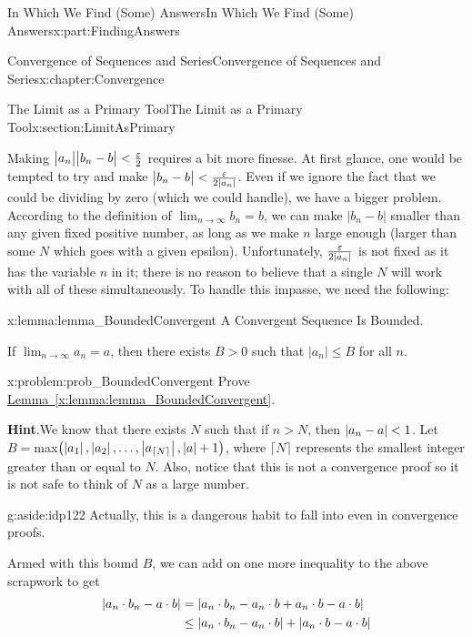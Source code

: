 \begin{partptx}{In Which We Find (Some) Answers}{}{In Which We Find (Some) Answers}{}{}{x:part:FindingAnswers}
\begin{chapterptx}{Convergence of Sequences and Series}{}{Convergence of Sequences and Series}{}{}{x:chapter:Convergence}
\begin{sectionptx}{The Limit as a Primary Tool}{}{The Limit as a Primary Tool}{}{}{x:section:LimitAsPrimary}
			\par
			Making \(\big|a_n\big|\big|b_n-b\big|< \frac{\varepsilon}{2}\) requires a bit more finesse. At first glance, one would be tempted to try and make \(\big|b_n-b\big|< \frac{\varepsilon}{2|a_n|}\). Even if we ignore the fact that we could be dividing by zero (which we could handle), we have a bigger problem. According to the definition of \(\lim_{n\rightarrow\infty}b_n=b\), we can make \(\big|b_n-b\big|\) smaller than any given fixed positive number, as long as we make \(n\) large enough (larger than some \(N\) which goes with a given epsilon). Unfortunately, \(\frac{\varepsilon}{2|a_n|}\) is not fixed as it has the variable \(n\) in it; there is no reason to believe that a single \(N\) will work with all of these simultaneously. To handle this impasse, we need the following:%
			\begin{lemma}{}{}{x:lemma:lemma_BoundedConvergent}%
				\alert{A Convergent Sequence Is Bounded.}%
				\par
				If \(\lim_{n\rightarrow\infty}a_n=a\), then there exists \(B>0\) such that \(|a_n|\leq B\) for all \(n\).%
			\end{lemma}
			\begin{problem}{}{x:problem:prob_BoundedConvergent}%
				Prove \hyperref[x:lemma:lemma_BoundedConvergent]{Lemma~{\xreffont\ref{x:lemma:lemma_BoundedConvergent}}}.%
				\par\smallskip%
				\noindent\textbf{\blocktitlefont Hint}.\hypertarget{g:hint:idp121}{}\quad{}We know that there exists \(N\) such that if \(n>N\), then \(\left|a_n-a\right|< 1\).  Let \(B=\)max\(\left(\left|a_1\right|,\left|a_2\right|,\ldots,\left|a_{\lceil{N}\rceil}\right|,\left|a\right|+1\right)\), where \(\lceil{N}\rceil\) represents the smallest integer greater than or equal to \(N\).  Also, notice that this is not a convergence proof so it is not safe to think of \(N\) as a large number.%
				\begin{aside}{}{g:aside:idp122}%
					Actually, this is a dangerous habit to fall into even in convergence proofs.%
				\end{aside}
			\end{problem}
			Armed with this bound \(B\), we can add on one more inequality to the above scrapwork to get%
			\begin{align*}
				\left|a_n\cdot b_n-a\cdot b\right|\amp =\left|a_n\cdot b_n-a_n\cdot b+a_n\cdot b-a\cdot b\right|\\
				\amp \leq\left|a_n\cdot b_n-a_n\cdot b\right|+\left|a_n\cdot b-a\cdot b\right|\\

\end{align*}
\end{sectionptx}
\end{chapterptx}
\end{partptx}
